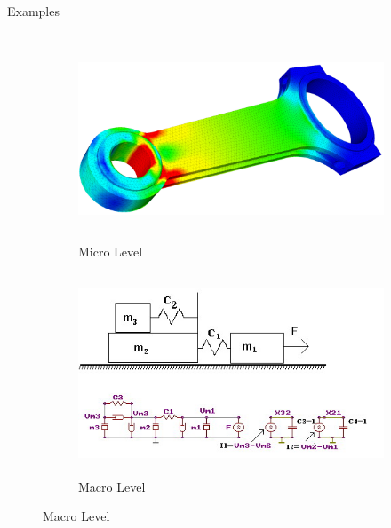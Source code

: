 \documentclass[aspectratio=169]{beamer}
\begin{document}
\begin{frame}[t]{Examples}
\framesubtitle{}
    \begin{figure}[H]
        \begin{subfigure}{0.49\textwidth}
            \centering\includegraphics[height=6cm,width=1\textwidth,keepaspectratio]{micro_level.png}
            \caption*{Micro Level}
            \label{fig:micro_level.png}
        \end{subfigure}
        \begin{subfigure}{0.49\textwidth}
            \centering\includegraphics[height=6cm,width=1\textwidth,keepaspectratio]{macro_level.png}
            \caption*{Macro Level}
            \label{fig:macro_level.png}
        \end{subfigure}
    
    \end{figure}
\end{frame}
\end{document}
